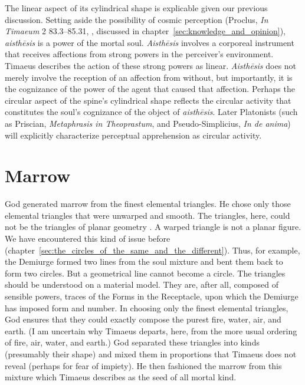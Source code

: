 The linear aspect of its cylindrical shape is explicable given our previous discussion. Setting aside the possibility of cosmic perception (Proclus, \emph{In Timaeum} 2 83.3–85.31, \citealt{Diehl:1903re}, discussed in chapter~\ref{sec:knowledge_and_opinion}), \emph{aisthēsis} is a power of the mortal soul. \emph{Aisthēsis} involves a corporeal instrument that receives affections from strong powers in the perceiver's environment. Timaeus describes the action of these strong powers as linear. \emph{Aisthēsis} does not merely involve the reception of an affection from without, but importantly, it is the cognizance of the power of the agent that caused that affection. Perhaps the circular aspect of the spine's cylindrical shape reflects the circular activity that constitutes the soul's cognizance of the object of \emph{aisthēsis}. Later Platonists (such as Priscian, \emph{Metaphrasis in Theoprastum}, and Pseudo-Simplicius, \emph{In de anima}) will explicitly characterize perceptual apprehension as circular activity.


\section{Marrow} %
\label{sec:marrow}

God generated marrow from the finest elemental triangles. He chose only those elemental triangles that were unwarped and smooth. The triangles, here, could not be the triangles of planar geometry \citep[293 n2]{Cornford:1935fk}. A warped triangle is not a planar figure. We have encountered this kind of issue before (chapter~\ref{sec:the_circles_of_the_same_and_the_different}). Thus, for example, the Demiurge formed two lines from the soul mixture and bent them back to form two circles. But a geometrical line cannot become a circle. The triangles should be understood on a material model. They are, after all, composed of sensible powers, traces of the Forms in the Receptacle, upon which the Demiurge has imposed form and number. In choosing only the finest elemental triangles, God ensures that they could exactly compose the purest fire, water, air, and earth. (I am uncertain why Timaeus departs, here, from the more usual ordering of fire, air, water, and earth.) God separated these triangles into kinds (presumably their shape) and mixed them in proportions that Timaeus does not reveal (perhaps for fear of impiety). He then fashioned the marrow from this mixture which Timaeus describes as the seed of all mortal kind. 

